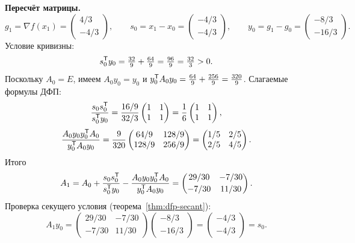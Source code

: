 \begin{example}
\medskip
\noindent\textbf{Пересчёт матрицы.}
\[
  g_1 = \nabla f(x_1) = \begin{pmatrix} 4/3 \\ -4/3 \end{pmatrix} ,
  \qquad
  s_0 = x_1 - x_0 = \begin{pmatrix} -4/3 \\ -4/3 \end{pmatrix} ,
  \qquad
  y_0 = g_1 - g_0 = \begin{pmatrix} -8/3 \\ -16/3 \end{pmatrix} .
\]
Условие кривизны:
\[
  s_0^{\mathsf{T}} y_0 = \tfrac{32}{9} + \tfrac{64}{9} = \tfrac{96}{9} = \tfrac{32}{3} > 0 .
\]
Поскольку $A_0 = E$, имеем $A_0 y_0 = y_0$ и
$y_0^{\mathsf{T}} A_0 y_0 = \tfrac{64}{9} + \tfrac{256}{9} = \tfrac{320}{9}$. Слагаемые
формулы ДФП:
\[
  \frac{s_0 s_0^{\mathsf{T}}}{s_0^{\mathsf{T}} y_0}
    = \frac{16/9}{32/3}\begin{pmatrix} 1 & 1 \\ 1 & 1 \end{pmatrix}
    = \frac16 \begin{pmatrix} 1 & 1 \\ 1 & 1 \end{pmatrix} ,
\]
\[
  \frac{A_0 y_0 y_0^{\mathsf{T}} A_0}{y_0^{\mathsf{T}} A_0 y_0}
    = \frac{9}{320}\begin{pmatrix} 64/9 & 128/9 \\ 128/9 & 256/9 \end{pmatrix}
    = \begin{pmatrix} 1/5 & 2/5 \\ 2/5 & 4/5 \end{pmatrix} .
\]
Итого
\[
  A_1 = A_0 + \frac{s_0 s_0^{\mathsf{T}}}{s_0^{\mathsf{T}} y_0}
            - \frac{A_0 y_0 y_0^{\mathsf{T}} A_0}{y_0^{\mathsf{T}} A_0 y_0}
      = \begin{pmatrix} 29/30 & -7/30 \\[2pt] -7/30 & 11/30 \end{pmatrix} .
\]
Проверка секущего условия (теорема~\ref{thm:dfp-secant}):
\[
  A_1 y_0
   = \begin{pmatrix} 29/30 & -7/30 \\ -7/30 & 11/30 \end{pmatrix}
     \begin{pmatrix} -8/3 \\ -16/3 \end{pmatrix}
   = \begin{pmatrix} -4/3 \\ -4/3 \end{pmatrix} = s_0 .
\]


\end{example}
